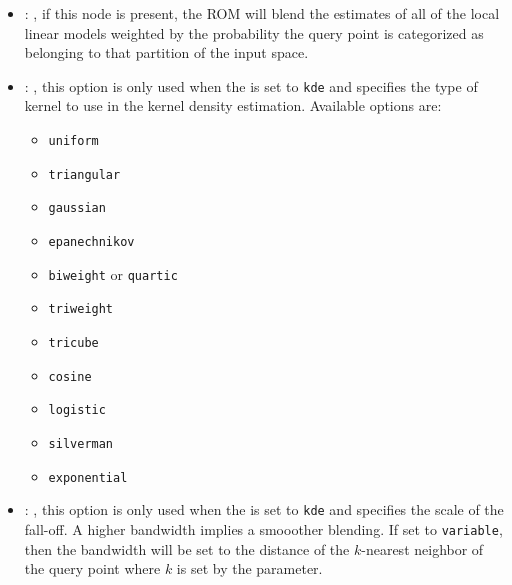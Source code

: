 \begin{itemize}
    \item {}: , 
      if this node is present, the ROM will blend the
      estimates of all of the local linear models weighted by the probability the
      query point is categorized as belonging to that partition of the input space.

    \item {}: , 
      this option is only                                                  used when the
       is set to \texttt{kde} and
      specifies the type of kernel to use in the kernel density estimation.
      Available options are:                                                  \begin{itemize}
      \item \texttt{uniform}                                                    \item
      \texttt{triangular}                                                    \item \texttt{gaussian}
      \item \texttt{epanechnikov}                                                    \item
      \texttt{biweight} or \texttt{quartic}                                                    \item
      \texttt{triweight}                                                    \item \texttt{tricube}
      \item \texttt{cosine}                                                    \item
      \texttt{logistic}                                                    \item \texttt{silverman}
      \item \texttt{exponential}                                                  \end{itemize}

    \item {}: , 
      this                                                  option is only used when the
       is set to
      \texttt{kde} and specifies the scale of the fall-off. A higher bandwidth
      implies a smooother blending. If set to \texttt{variable}, then the bandwidth
      will be set to the distance of the $k$-nearest neighbor of the query point
      where $k$ is set by the  parameter.
  \end{itemize}

